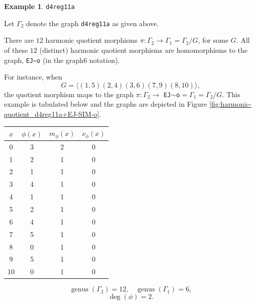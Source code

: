 \documentclass[12pt,letterpaper]{article}
\theoremstyle{definition}
\newtheorem{example}[theorem]{Example}
\DeclareMathOperator{\genus}{genus}
\begin{document}
\begin{example}%
\label{example:d4reg11a}
 {\tt d4reg11a}\newline
{\rm  
  Let $\Gamma_2$ denote the graph {\tt d4reg11a} as given above.

  There are $12$ harmonic quotient morphisms
$\pi: \Gamma_2\to \Gamma_1=\Gamma_2/G$, for some $G$. 
All of these $12$ (distinct) harmonic quotient morphisms are homomorphisms to the
graph, \verb+EJ~o+ (in the graph6 notation).

For instance, when
\[
G = \langle  (1,5)(2,4)(3,6)(7,9)(8,10)\rangle ,
\]
the quotient morphism maps to the  graph
$\pi: \Gamma_2\to$ {\tt EJ$\sim$o}$=\Gamma_1=\Gamma_2/G $. This example
is tabulated below and the graphs are depicted in
Figure \ref{fig:harmonic-quotient_d4reg11a+EJ-SIM-o}.

\begin{center}
\begin{tabular}{c|c|c|c}  
  $x$ & $\phi(x)$ & $m_\phi(x)$ & $\nu_\phi(x)$ \\ \hline
  0   &    3   &        2         &  0   \\ 
  1   &    2   &        1         &  0  \\ 
  2   &    1   &        1         &  0  \\ 
  3   &    4   &        1         &  0  \\ 
  4   &    1   &        1         &  0   \\
  5   &    2   &        1         &  0   \\
  6   &    4   &        1         &  0   \\
  7   &    5   &        1         &  0   \\
  8   &    0   &        1         &  0   \\
  9   &    5   &        1         &  0   \\
  10   &   0   &        1         &  0  \\   
\end{tabular}
\end{center}

\[
  \genus(\Gamma_2) =12,\ \ \ \ 
  \genus(\Gamma_1) =6,
\]
\[
\deg(\phi) =2.
\]

}
\end{example}
\end{document}
